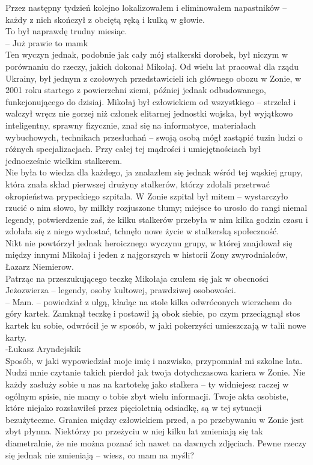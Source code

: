 \documentclass[../MAIN.tex]{subfiles}
\begin{document}
Przez następny tydzień kolejno lokalizowałem i eliminowałem napastników -- każdy z nich skończył z obciętą ręką i kulką w głowie.\\
To był naprawdę trudny miesiąc.\\
-- Już prawie to mam\3k\\
Ten wyczyn jednak, podobnie jak cały mój stalkerski dorobek, był niczym w porównaniu do rzeczy, jakich dokonał Mikołaj. Od wielu lat pracował dla rządu Ukrainy, był jednym z czołowych przedstawicieli ich głównego obozu w Zonie, w 2001 roku startego z powierzchni ziemi, później jednak odbudowanego, funkcjonującego do dzisiaj. Mikołaj był człowiekiem od wszystkiego -- strzelał i walczył wręcz nie gorzej niż członek elitarnej jednostki wojska, był wyjątkowo inteligentny, sprawny fizycznie, znał się na informatyce, materiałach wybuchowych, technikach przesłuchań -- swoją osobą mógł zastąpić tuzin ludzi o różnych specjalizacjach. Przy całej tej mądrości i umiejętnościach był jednocześnie wielkim stalkerem.\\
Nie była to wiedza dla każdego, ja znalazłem się jednak wśród tej wąskiej grupy, która znała skład pierwszej drużyny stalkerów, którzy zdołali przetrwać okropieństwa prypeckiego szpitala. W Zonie szpital był mitem -- wystarczyło rzucić o nim słowo, by milkły rozjuszone tłumy; miejsce to urosło do rangi niemal legendy, potwierdzenie zaś, że kilku stalkerów przebyła w nim kilka godzin czasu i zdołała się z niego wydostać, tchnęło nowe życie w stalkerską społeczność.\\
Nikt nie powtórzył jednak heroicznego wyczynu grupy, w której znajdował się między innymi Mikołaj i jeden z najgorszych w historii Zony zwyrodnialców, Łazarz Niemierow.\\
Patrząc na przeszukującego teczkę Mikołaja czułem się jak w obecności Jeżozwierza -- legendy, osoby kultowej, prawdziwej osobowości.\\
% 
-- Mam. -- powiedział z ulgą, kładąc na stole kilka odwróconych wierzchem do góry kartek. Zamknął teczkę i postawił ją obok siebie, po czym przeciągnął stos kartek ku sobie, odwrócił je w sposób, w jaki pokerzyści umieszczają w talii nowe karty.\\
-Łukasz Aryndejski\3k\\
Sposób, w jaki wypowiedział moje imię i nazwisko, przypomniał mi szkolne lata.
% 
\sx Nudzi mnie czytanie takich pierdoł jak twoja dotychczasowa kariera w Zonie. Nie każdy zasłuży sobie u nas na kartotekę jako stalkera -- ty widniejesz raczej w ogólnym spisie, nie mamy o tobie zbyt wielu informacji. Twoje akta osobiste, które niejako rozsławiłeś przez pięcioletnią odsiadkę, są w tej sytuacji bezużyteczne. Granica między człowiekiem przed, a po przebywaniu w Zonie jest zbyt płynna. Niektórzy po przeżyciu w niej kilku lat zmieniają się tak diametralnie, że nie można poznać ich nawet na dawnych zdjęciach. Pewne rzeczy się jednak nie zmieniają -- wiesz, co mam na myśli?
\end{document}

